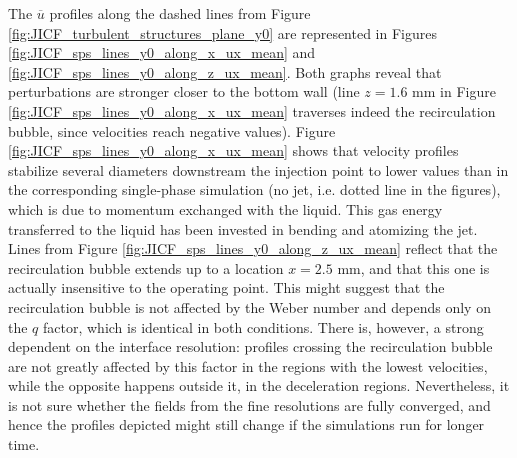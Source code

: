 The $\overline{u}$ profiles along the dashed lines from Figure \ref{fig:JICF_turbulent_structures_plane_y0} are represented in Figures \ref{fig:JICF_sps_lines_y0_along_x_ux_mean} and  \ref{fig:JICF_sps_lines_y0_along_z_ux_mean}. Both graphs reveal that perturbations are stronger closer to the bottom wall (line $z = 1.6$ mm in Figure \ref{fig:JICF_sps_lines_y0_along_x_ux_mean}  traverses indeed the recirculation bubble, since velocities reach negative values). Figure \ref{fig:JICF_sps_lines_y0_along_x_ux_mean} shows that velocity profiles stabilize several diameters downstream the injection point to lower values than in the corresponding single-phase simulation (no jet, i.e. dotted line in the figures), which is due to momentum exchanged with the liquid. This gas energy transferred to the liquid has been invested in bending and atomizing the jet. Lines from Figure \ref{fig:JICF_sps_lines_y0_along_z_ux_mean} reflect that the recirculation bubble extends up to a location $x = 2.5$ mm, and that this one is actually insensitive to the operating point. This might suggest that the recirculation bubble is not affected by the Weber number and depends only on the $q$ factor, which is identical in both conditions. There is, however, a strong dependent on the interface resolution: profiles crossing the recirculation bubble are not greatly affected by this factor in the regions with the lowest velocities, while the opposite happens outside it, in the deceleration regions. Nevertheless, it is not sure whether the fields from the fine resolutions are fully converged, and hence the profiles depicted might still change if the simulations run for longer time.



